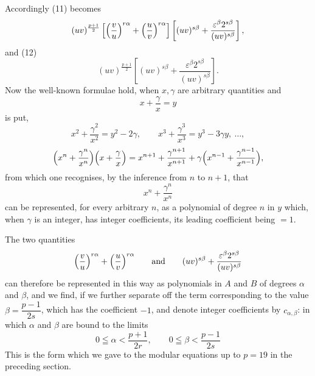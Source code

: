 Accordingly (11) becomes
\[
(uv)^{\frac{p+1}{2}}\left[\Bigl(\frac{v}{u}\Bigr)^{r\alpha}+\Bigl(\frac{u}{v}\Bigr)^{r\alpha}\right]\left[(uv)^{s\beta}+\frac{\varepsilon^\beta2^{s\beta}}{(uv)^{s\beta}}\right],
\]
and (12)
\[
(uv)^{\frac{p+1}{2}}\left[(uv)^{s\beta}+\frac{\varepsilon^\beta2^{s\beta}}{(uv)^{s\beta}}\right].
\]
Now the well-known formulae hold, when $x, \gamma$ are arbitrary
quantities and
\[
x+\frac{\gamma}{x}=y
\]
is put,
\[
x^2+\frac{\gamma^2}{x^2}=y^2-2\gamma, \qquad x^3+\frac{\gamma^3}{x^3}=y^3-3\gamma y,\ \ldots,
\]
\[
\Bigl(x^n+\frac{\gamma^n}{x^n}\Bigr)\Bigl(x+\frac{\gamma}{x}\Bigr)=x^{n+1}+\frac{\gamma^{n+1}}{x^{n+1}}+\gamma\Bigl(x^{n-1}+\frac{\gamma^{n-1}}{x^{n-1}}\Bigr),
\]
from which one recognises, by the inference from $n$ to $n+1$, that
\[
x^n+\frac{\gamma^n}{x^n}
\]
can be represented, for every arbitrary $n$, as a polynomial of degree
$n$ in $y$ which, when $\gamma$ is an integer, has integer coefficients,
its leading coefficient being $=1$.

The two quantities
\[
\Bigl(\frac{v}{u}\Bigr)^{r\alpha}+\Bigl(\frac{u}{v}\Bigr)^{r\alpha} \qquad \text{and} \qquad (uv)^{s\beta}+\frac{\varepsilon^\beta2^{s\beta}}{(uv)^{s\beta}}
\]
can therefore be represented in this way as polynomials in $A$ and $B$
of degrees $\alpha$ and $\beta$, and we find, if we
further separate off the term corresponding to the value
$\beta=\dfrac{p-1}{2s}$, which has the coefficient $-1$, and denote
integer coefficients by $c_{\alpha,\beta}$:
in which $\alpha$ and $\beta$ are bound to the limits
\[
0\leqq\alpha<\frac{p+1}{2r}, \qquad 0\leqq\beta<\frac{p-1}{2s}
\]
This is the form which we gave to the modular equations up to $p=19$
in the preceding section.
